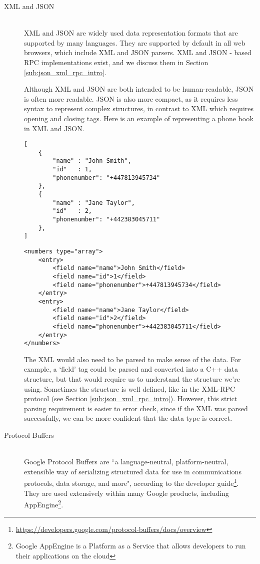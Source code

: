 \begin{description}
	\item[XML and JSON] 
	~\\
	XML and JSON are widely used data representation formats that are supported by many languages. They are supported by default in all web browsers, which include XML and JSON parsers. XML and JSON - based RPC implementations exist, and we discuss them in Section \ref{sub:json_xml_rpc_intro}.

	Although XML and JSON are both intended to be human-readable, JSON is often more readable. JSON is also more compact, as it requires less syntax to represent complex structures, in contrast to XML which requires opening and closing tags. Here is an example of representing a phone book in XML and JSON.

	\begin{lstlisting}
[
	{
		"name" : "John Smith",
		"id"   : 1,
		"phonenumber": "+447813945734"
	},
	{
		"name" : "Jane Taylor",
		"id"   : 2,
		"phonenumber": "+442383045711"
	},
]
	\end{lstlisting}
	\begin{lstlisting}
<numbers type="array">
    <entry>
    	<field name="name">John Smith</field>
    	<field name="id">1</field>
    	<field name="phonenumber">+447813945734</field>
    </entry>
    <entry>
    	<field name="name">Jane Taylor</field>
    	<field name="id">2</field>
    	<field name="phonenumber">+442383045711</field>
    </entry>
</numbers>
	\end{lstlisting}

	The XML would also need to be parsed to make sense of the data. For example, a `field' tag could be parsed and converted into a C++ data structure, but that would require us to understand the structure we're using. Sometimes the structure is well defined, like in the XML-RPC protocol (see Section \ref{sub:json_xml_rpc_intro}). However, this strict parsing requirement is easier to error check, since if the XML was parsed successfully, we can be more confident that the data type is correct. 

	\item[Protocol Buffers] 
	~\\
	Google Protocol Buffers are ``a language-neutral, platform-neutral, extensible way of serializing structured data for use in communications protocols, data storage, and more", according to the developer guide\footnote{\label{googleprotobuff}\url{https://developers.google.com/protocol-buffers/docs/overview}}. They are used extensively within many Google products, including AppEngine\footnote{Google AppEngine is a Platform as a Service that allows developers to run their applications on the cloud}. 


\end{description}
